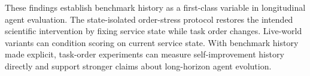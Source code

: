 These findings establish benchmark history as a first-class variable in longitudinal agent evaluation. The state-isolated order-stress protocol restores the intended scientific intervention by fixing service state while task order changes. Live-world variants can condition scoring on current service state. With benchmark history made explicit, task-order experiments can measure self-improvement history directly and support stronger claims about long-horizon agent evolution.
